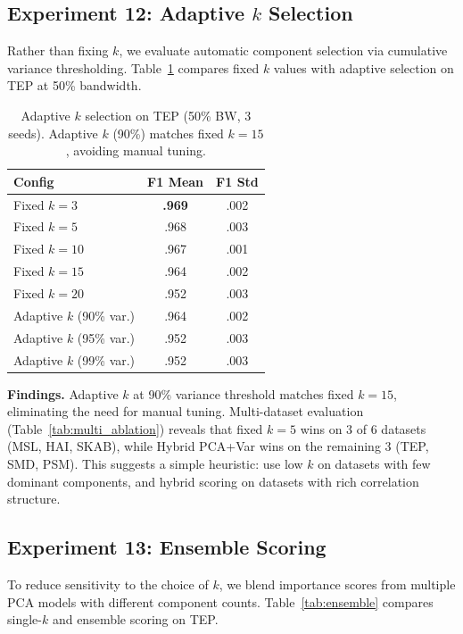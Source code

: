 \documentclass[journal]{IEEEtran}
\begin{document}
\subsection{Experiment 12: Adaptive $k$ Selection}

Rather than fixing $k$, we evaluate automatic component selection via cumulative variance thresholding. Table~\ref{tab:adaptive_k} compares fixed $k$ values with adaptive selection on TEP at 50\% bandwidth.

\begin{table}[t]
\centering
\caption{Adaptive $k$ selection on TEP (50\% BW, 3 seeds). Adaptive $k$ (90\%) matches fixed $k{=}15$, avoiding manual tuning.}
\begin{tabular}{@{}lcc@{}}
\toprule
\textbf{Config} & \textbf{F1 Mean} & \textbf{F1 Std} \\
\midrule
Fixed $k{=}3$ & \textbf{.969} & .002 \\
Fixed $k{=}5$ & .968 & .003 \\
Fixed $k{=}10$ & .967 & .001 \\
Fixed $k{=}15$ & .964 & .002 \\
Fixed $k{=}20$ & .952 & .003 \\
\midrule
Adaptive $k$ (90\% var.) & .964 & .002 \\
Adaptive $k$ (95\% var.) & .952 & .003 \\
Adaptive $k$ (99\% var.) & .952 & .003 \\
\bottomrule
\end{tabular}
\label{tab:adaptive_k}
\end{table}

\textbf{Findings.} Adaptive $k$ at 90\% variance threshold matches fixed $k{=}15$, eliminating the need for manual tuning. Multi-dataset evaluation (Table~\ref{tab:multi_ablation}) reveals that fixed $k{=}5$ wins on 3 of 6 datasets (MSL, HAI, SKAB), while Hybrid PCA+Var wins on the remaining 3 (TEP, SMD, PSM). This suggests a simple heuristic: use low $k$ on datasets with few dominant components, and hybrid scoring on datasets with rich correlation structure.

\subsection{Experiment 13: Ensemble Scoring}

To reduce sensitivity to the choice of $k$, we blend importance scores from multiple PCA models with different component counts. Table~\ref{tab:ensemble} compares single-$k$ and ensemble scoring on TEP.
\end{document}
